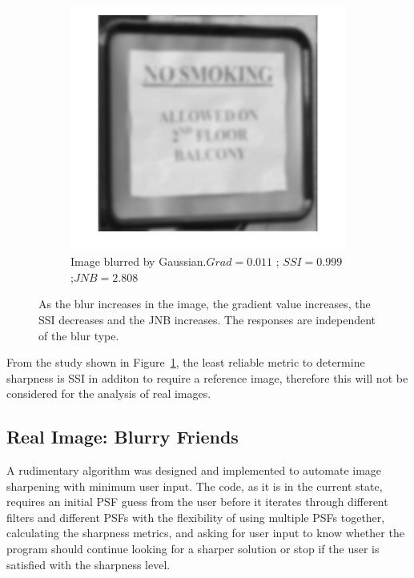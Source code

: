 \begin{figure}[H]
\begin{subfigure}[b]{0.3\textwidth}
        \end{subfigure}
        \hspace{.6cm}
        \begin{subfigure}[b]{0.3\textwidth}
                \centering
                \includegraphics[width=\textwidth]{sign_G.jpg}
                \caption{\fontsize{10}{1} \selectfont Image blurred by Gaussian.\newline $Grad=0.011$ ; $SSI=0.999$ ;\newline $JNB=2.808$} 
        \end{subfigure} 
       
        \caption{\fontsize{10}{1} \selectfont As the blur increases in the image, the gradient value increases, the SSI decreases and the JNB increases. The responses are independent of the blur type.} \label{fig:train_metrics}
\end{figure}

\noindent From the study shown in Figure~\ref{fig:train_metrics}, the least reliable metric to determine sharpness is SSI in additon to require a reference image, therefore this will not be considered for the analysis of real images.

\subsection{Real Image: Blurry Friends}
A rudimentary algorithm was designed and  implemented to automate image sharpening with minimum user input. The code, as it is in the current state, requires an initial PSF guess from the user before it  iterates through different filters and different PSFs with the flexibility of using multiple PSFs together, calculating the sharpness metrics, and asking for user input to know whether the program should continue looking for a sharper solution or stop if the user is satisfied with the sharpness level. \\

